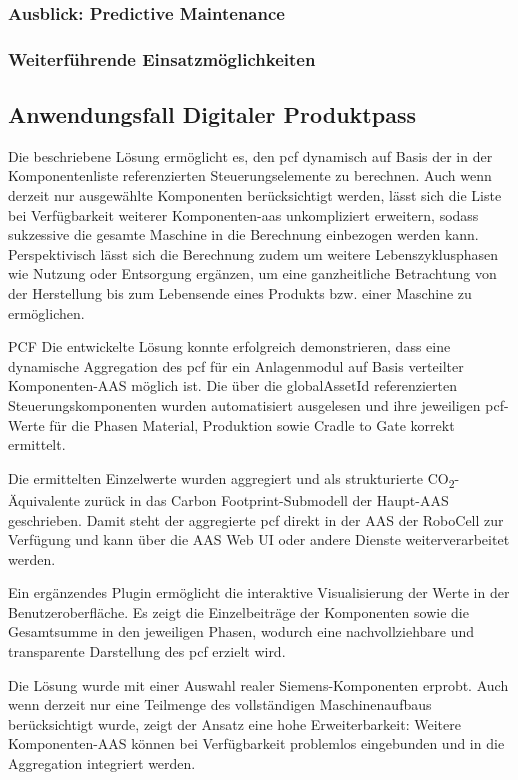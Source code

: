 \subsubsection{Ausblick: Predictive Maintenance}
\subsubsection{Weiterführende Einsatzmöglichkeiten}
\subsection{Anwendungsfall Digitaler Produktpass}

Die beschriebene Lösung ermöglicht es, den \acs{pcf} dynamisch auf Basis der in der Komponentenliste referenzierten Steuerungselemente zu berechnen. 
Auch wenn derzeit nur ausgewählte Komponenten berücksichtigt werden, lässt sich die Liste bei Verfügbarkeit weiterer Komponenten-\acs{aas} unkompliziert erweitern, sodass sukzessive die gesamte Maschine in die Berechnung einbezogen werden kann. 
Perspektivisch lässt sich die Berechnung zudem um weitere Lebenszyklusphasen wie Nutzung oder Entsorgung ergänzen, um eine ganzheitliche Betrachtung von der Herstellung bis zum Lebensende eines Produkts bzw. einer Maschine zu ermöglichen.


PCF
Die entwickelte Lösung konnte erfolgreich demonstrieren, dass eine dynamische Aggregation des \acs{pcf} für ein Anlagenmodul auf Basis verteilter Komponenten-AAS möglich ist. Die über die globalAssetId referenzierten Steuerungskomponenten wurden automatisiert ausgelesen und ihre jeweiligen \acs{pcf}-Werte für die Phasen Material, Produktion sowie Cradle to Gate korrekt ermittelt.

Die ermittelten Einzelwerte wurden aggregiert und als strukturierte CO\textsubscript{2}-Äquivalente zurück in das Carbon Footprint-Submodell der Haupt-AAS geschrieben. Damit steht der aggregierte \acs{pcf} direkt in der AAS der RoboCell zur Verfügung und kann über die AAS Web UI oder andere Dienste weiterverarbeitet werden.

Ein ergänzendes Plugin ermöglicht die interaktive Visualisierung der Werte in der Benutzeroberfläche. Es zeigt die Einzelbeiträge der Komponenten sowie die Gesamtsumme in den jeweiligen Phasen, wodurch eine nachvollziehbare und transparente Darstellung des \acs{pcf} erzielt wird.

Die Lösung wurde mit einer Auswahl realer Siemens-Komponenten erprobt. Auch wenn derzeit nur eine Teilmenge des vollständigen Maschinenaufbaus berücksichtigt wurde, zeigt der Ansatz eine hohe Erweiterbarkeit: Weitere Komponenten-AAS können bei Verfügbarkeit problemlos eingebunden und in die Aggregation integriert werden.

